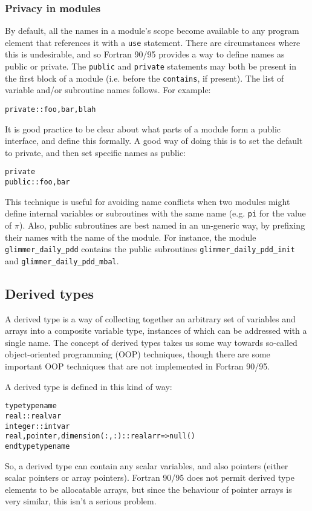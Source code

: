 \subsubsection{Privacy in modules}
%
By default, all the names in a module's scope become available to any program
element that references it with a \texttt{use} statement. There are
circumstances where this is undesirable, and so Fortran 90/95 provides a way
to define names as public or private. The \texttt{public} and \texttt{private}
statements may both be present in the first block of a module (i.e. before the
\texttt{contains}, if present). The list of variable and/or subroutine names
follows. For example:
%
\begin{alltt}
    private :: foo, bar, blah
\end{alltt}
%
It is good practice to be clear about what parts of a module form a public
interface, and define this formally. A good way of doing this is to set the
default to private, and then set specific names as public:
%
\begin{alltt}
    private
    public :: foo, bar
\end{alltt}
%
This technique is useful for avoiding name conflicts when two modules might
define internal variables or subroutines with the same name (e.g. \texttt{pi}
for the value of
$\pi$). Also, public subroutines are best named in an un-generic way, by
prefixing their names with the name of the module. For instance, the module
\texttt{glimmer\_daily\_pdd} contains the public subroutines
\texttt{glimmer\_daily\_pdd\_init} and \texttt{glimmer\_daily\_pdd\_mbal}.
%
\subsection{Derived types}
%
A derived type is a way of collecting together an arbitrary set of
variables and arrays into a composite variable type, instances of which can be addressed with a
single name. The concept of derived types takes us some way towards so-called
object-oriented programming (OOP) techniques, though there are some important
OOP techniques that are not implemented in Fortran 90/95.

A derived type is defined in this kind of way:
\begin{alltt}
    type typename
        real :: realvar
        integer :: intvar
        real,pointer,dimension(:,:) :: realarr => null()
    end type typename
\end{alltt}
So, a derived type can contain any scalar variables, and also pointers (either
scalar pointers or array pointers). Fortran 90/95 does not permit derived type
elements to be allocatable arrays, but since the behaviour of pointer arrays
is very similar, this isn't a serious problem.

